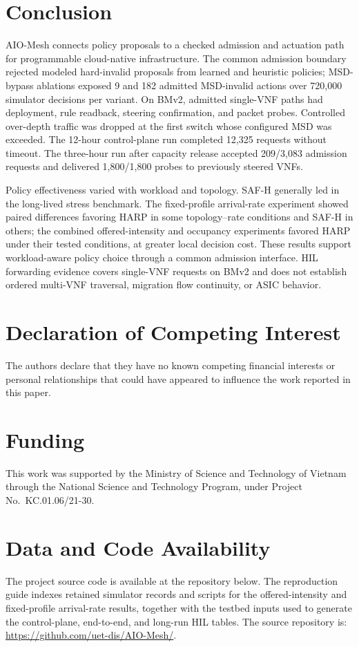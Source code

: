 \documentclass[final,5p]{elsarticle}
\newcommand{\rev}[1]{\textcolor{revisiongreen}{#1}}
\let\newrev\rev
\newcommand{\HILRequests}{12,325}
\begin{document}
\section{Conclusion}
\label{sec:conclusion}
\newrev{AIO-Mesh connects policy proposals to a checked admission and actuation path for programmable cloud-native infrastructure. The common admission boundary rejected modeled hard-invalid proposals from learned and heuristic policies; MSD-bypass ablations exposed 9 and 182 admitted MSD-invalid actions over 720,000 simulator decisions per variant. On BMv2, admitted single-VNF paths had deployment, rule readback, steering confirmation, and packet probes. Controlled over-depth traffic was dropped at the first switch whose configured MSD was exceeded. The 12-hour control-plane run completed \HILRequests{} requests without timeout. The three-hour run after capacity release accepted 209/3,083 admission requests and delivered 1,800/1,800 probes to previously steered VNFs.}

\newrev{Policy effectiveness varied with workload and topology. SAF-H generally led in the long-lived stress benchmark. The fixed-profile arrival-rate experiment showed paired differences favoring HARP in some topology--rate conditions and SAF-H in others; the combined offered-intensity and occupancy experiments favored HARP under their tested conditions, at greater local decision cost. These results support workload-aware policy choice through a common admission interface. HIL forwarding evidence covers single-VNF requests on BMv2 and does not establish ordered multi-VNF traversal, migration flow continuity, or ASIC behavior.}



\section*{Declaration of Competing Interest}
The authors declare that they have no known competing financial interests or personal relationships that could have appeared to influence the work reported in this paper.

\section*{Funding} 
\noindent This work was supported by the Ministry of Science and Technology of Vietnam through the National Science and Technology Program, under Project No.~KC.01.06/21-30.

\section*{Data and Code Availability}
\newrev{The project source code is available at the repository below. The reproduction guide indexes retained simulator records and scripts for the offered-intensity and fixed-profile arrival-rate results, together with the testbed inputs used to generate the control-plane, end-to-end, and long-run HIL tables. The source repository is:}
\url{https://github.com/uet-dis/AIO-Mesh/}.
\end{document}
